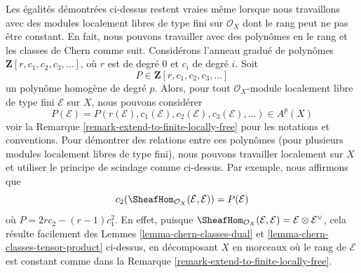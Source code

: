 \begin{remark}
\label{remark-equalities-nonconstant-rank}
Les égalités démontrées ci-dessus restent vraies même lorsque nous travaillons avec
des modules localement libres de type fini
sur $\mathcal{O}_X$ dont le rang peut ne pas être constant.
En fait, nous pouvons travailler avec des polynômes en le rang et les
classes de Chern comme suit. Considérons l'anneau gradué de polynômes
$\mathbf{Z}[r, c_1, c_2, c_3, \ldots]$,
où $r$ est de degré $0$ et $c_i$ de degré $i$. Soit
$$
P \in \mathbf{Z}[r, c_1, c_2, c_3, \ldots]
$$
un polynôme homogène de degré $p$. Alors, pour tout
$\mathcal{O}_X$-module localement libre de type fini $\mathcal{E}$ sur $X$, nous pouvons considérer
$$
P(\mathcal{E}) =
P(r(\mathcal{E}), c_1(\mathcal{E}), c_2(\mathcal{E}), c_3(\mathcal{E}), \ldots)
\in A^p(X)
$$
voir la Remarque \ref{remark-extend-to-finite-locally-free} pour les notations et
conventions. Pour démontrer des relations entre ces polynômes (pour plusieurs
modules localement libres de type fini), nous pouvons travailler localement sur $X$ et utiliser le principe de
scindage comme ci-dessus. Par exemple, nous affirmons que
$$
c_2(\SheafHom_{\mathcal{O}_X}(\mathcal{E}, \mathcal{E})) =
P(\mathcal{E})
$$
où $P = 2rc_2 - (r - 1)c_1^2$.
En effet, puisque $\SheafHom_{\mathcal{O}_X}(\mathcal{E}, \mathcal{E}) =
\mathcal{E} \otimes \mathcal{E}^\vee$, cela résulte facilement des
Lemmes \ref{lemma-chern-classes-dual} et
\ref{lemma-chern-classes-tensor-product}
ci-dessus, en décomposant $X$ en morceaux où le rang
de $\mathcal{E}$ est constant comme dans la
Remarque \ref{remark-extend-to-finite-locally-free}.
\end{remark}

